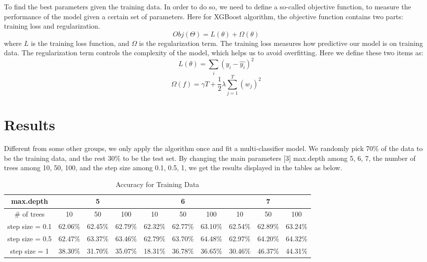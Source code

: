 \documentclass{article}
\begin{document}
\begin{spacing}{1.5}
\begin{large}
\noindent \indent To find the best parameters given the training data. In order to do so, we need to define a so-called objective function, to measure the performance of the model given a certain set of parameters. Here for XGBoost algorithm, the objective function contains two parts: training loss and regularization.
\[
Obj(\Theta) = L(\theta) + \Omega(\theta)
\]
where $L$ is the training loss function, and $\Omega$ is the regularization term. The training loss measures how predictive our model is on training data. The regularization term controls the complexity of the model, which helps us to avoid overfitting. Here we define these two items as:
\[
L(\theta) = \sum_{i}(y_i - \hat{y_i})^2
\]
\[
\Omega(f) = \gamma T + \frac{1}{2}\lambda\sum_{j = 1}^{T}(w_j)^2
\]
 



\section{Results} 

\noindent \indent Different from some other groups, we only apply the algorithm once and fit a multi-classifier model. We randomly pick 70\% of the data to be the training data, and the rest 30\% to be the test set. By changing the main parameters [3] max.depth among 5, 6, 7, the number of trees among 10, 50, 100, and the step size among 0.1, 0.5, 1, we get the results displayed in the tables as below.
\begin{table}[h]
\centering
\caption{Accuracy for Training Data}
\label{Accuracy for Training Data}
\begin{tabular}{cccccccccc}
\hline
max.depth       & \multicolumn{3}{c}{5} & \multicolumn{3}{c}{6} & \multicolumn{3}{c}{7} \\ \hline
\# of trees     & 10    & 50    & 100   & 10  & 50       & 100  & 10    & 50    & 100   \\
step size = 0.1 & 62.06\%    & 62.45\%     & 62.79\%     & 62.32\%    & 62.77\%         & 63.10\%      & 62.54\%     & 62.89\%      & 63.24\%      \\
step size = 0.5 & 62.47\%    & 63.37\%       & 63.46\%      & 62.79\%   & 63.70\%  & 64.48\%     & 62.97\%       & 64.20\%      & 64.32\%      \\
step size = 1   &38.30\%       & 31.70\%      &35.07\%       &18.31\%     & 36.78\%         &36.65\%      &30.46\%       &46.37\%       &44.31\%       \\ \hline
\end{tabular}
\end{table}


\end{large}
\end{spacing}
\end{document}

